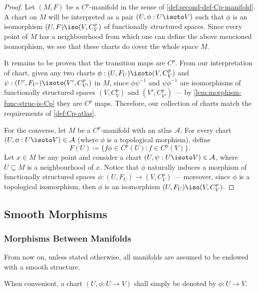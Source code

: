 \begin{proof}
Let \((M, F)\) be a \(C^p\)-manifold in the sense of
\cref{def:second-def-Cp-manifold}. A chart on \(M\) will be interpreted as a
pair \((U, \phi: U \isoto V)\) such that \(\phi\) is an isomorphism
\((U, F) \iso (V, C_V^p)\) of functionally structured spaces. Since every point
of \(M\) has a neighbourhood from which one can define the above mencioned
isomorphism, we see that these charts do cover the whole space \(M\).

It remains to be proven that the transition maps are \(C^p\). From our
interpretation of chart, given any two charts
\(\phi: (U, F_U) \isoto (V, C_V^p)\) and
\(\psi: (U', F_{U'}) \isoto (V', C_{V'}^p)\) in \(M\), since \(\phi \psi^{-1}\)
and \(\psi \phi^{-1}\) are isomorphisms of functionally structured spaces
\((V, C_V^p)\) and \((V', C_{V'}^p)\) --- by \cref{lem:morphism-func-struc-is-Cp}
they are \(C^p\) maps. Therefore, our collection of charts match the
requirements of \cref{def:Cp-atlas}.

For the converse, let \(M\) be a \(C^p\)-manifold with an atlas
\(\mathcal{A}\). For every chart \((U, \phi: U \isoto V) \in \mathcal{A}\)
(where \(\phi\) is a topological morphism), define
\[
F(U) \coloneq \{f \phi \in C^{p}(U) \colon f \in C^p(V)\}.
\]
Let \(x \in M\) be any point and consider a chart \((U, \psi: U \isoto V)
\in \mathcal{A}\), where \(U \subseteq M\) is a neighbourhood of \(x\). Notice
that \(\phi\) naturally induces a morphism of functionally structured spaces
\(\phi: (U, F_U) \to (V, C_V^p)\) --- moreover, since \(\phi\) is a topological
isomorphism, then \(\phi\) is an isomorphism \((U, F_U) \iso (V, C_V^p)\).
\end{proof}


\subsection{Smooth Morphisms}

\subsubsection{Morphisms Between Manifolds}

\begin{remark}
\label{rem:manifolds-convention-are-smooth}
From now on, unless stated otherwise, all manifolds are assumed to be endowed
with a smooth structure.
\end{remark}

\begin{remark}
\label{rem:chart-notation}
When convenient, a chart \((U, \phi: U \to V)\) shall simply be denoted by
\(\phi: U \to V\).
\end{remark}

